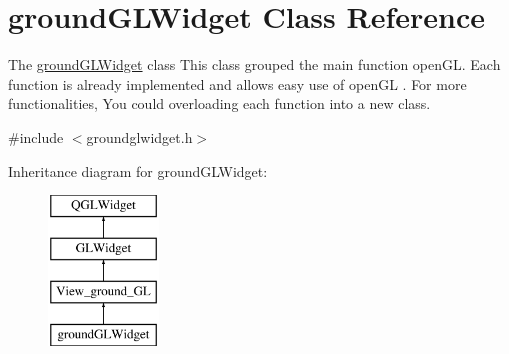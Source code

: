 \hypertarget{classgroundGLWidget}{\section{ground\-G\-L\-Widget Class Reference}
\label{classgroundGLWidget}
}


The \hyperlink{classgroundGLWidget}{ground\-G\-L\-Widget} class This class grouped the main function open\-G\-L. Each function is already implemented and allows easy use of open\-G\-L . For more functionalities, You could overloading each function into a new class.  




{\ttfamily \#include $<$groundglwidget.\-h$>$}

Inheritance diagram for ground\-G\-L\-Widget\-:\begin{figure}[H]
\begin{center}
\leavevmode
\includegraphics[height=4.000000cm]{classgroundGLWidget}
\end{center}
\end{figure}
